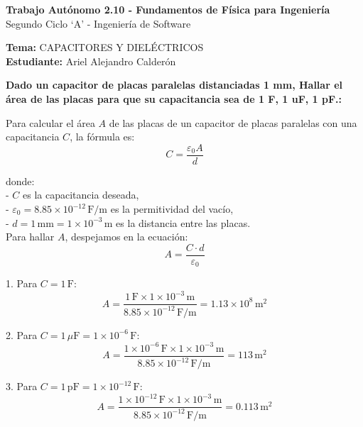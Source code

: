 \documentclass[answers]{exam} %
\begin{document}
\begin{center}
    \large\textbf{Trabajo Autónomo 2.10 - Fundamentos de Física para Ingeniería}\\[1em]
    \large Segundo Ciclo \enquote*{A} - Ingeniería de Software\\[1em]
\end{center}

\vspace{0.5cm}
\noindent
\large\textbf{Tema:} CAPACITORES Y DIELÉCTRICOS \\
\large\textbf{Estudiante:} Ariel Alejandro Calderón
\vspace{0.5cm}

\begin{questions}

    \question \large\textbf{Dado un capacitor de placas paralelas distanciadas 1 mm, Hallar el área de las placas para que su capacitancia sea de 1 F, 1 uF, 1 pF.:}
  
        Para calcular el área \( A \) de las placas de un capacitor de placas paralelas con una capacitancia \( C \), la fórmula es:
        \[
        C = \frac{\varepsilon_0 A}{d}
        \]

        donde:\\
        - \( C \) es la capacitancia deseada,\\
        - \( \varepsilon_0 = 8.85 \times 10^{-12} \, \text{F/m} \) es la permitividad del vacío,\\
        - \( d = 1 \, \text{mm} = 1 \times 10^{-3} \, \text{m} \) es la distancia entre las placas.\\

        
        Para hallar \( A \), despejamos en la ecuación:
        \[
        A = \frac{C \cdot d}{\varepsilon_0}
        \]
        
        1. Para \( C = 1 \, \text{F} \):
           \[
           A = \frac{1 \, \text{F} \times 1 \times 10^{-3} \, \text{m}}{8.85 \times 10^{-12} \, \text{F/m}} = 1.13 \times 10^8 \, \text{m}^2
           \]
        
        2. Para \( C = 1 \, \mu \text{F} = 1 \times 10^{-6} \, \text{F} \):
           \[
           A = \frac{1 \times 10^{-6} \, \text{F} \times 1 \times 10^{-3} \, \text{m}}{8.85 \times 10^{-12} \, \text{F/m}} = 113 \, \text{m}^2
           \]
        
        3. Para \( C = 1 \, \text{pF} = 1 \times 10^{-12} \, \text{F} \):
           \[
           A = \frac{1 \times 10^{-12} \, \text{F} \times 1 \times 10^{-3} \, \text{m}}{8.85 \times 10^{-12} \, \text{F/m}} = 0.113 \, \text{m}^2
           \]
        

\end{questions}
\end{document}
